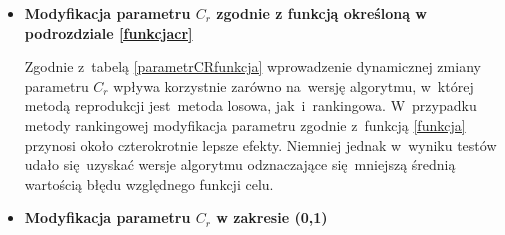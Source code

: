 \begin{itemize}
\item  \textbf{Modyfikacja parametru $C_{r}$ zgodnie z funkcją określoną w podrozdziale \ref{funkcjacr}}


\begin{table}[h!]
\begin{center}
\caption{Wartości średniego błędu względnego funkcji celu dla metody krzyżowania dwumianowego ze zmiennym parametrem $C_{r}$ zgodnie z funkcją \ref{funkcjacr}.}
\label{parametrCRfunkcja}
\end{center}
\end{table}

Zgodnie z~tabelą \ref{parametrCRfunkcja} wprowadzenie dynamicznej zmiany parametru $C_{r}$ wpływa korzystnie zarówno na~wersję algorytmu, w~której metodą reprodukcji jest~metoda losowa, jak~i~rankingowa. W~przypadku metody rankingowej modyfikacja parametru zgodnie z~funkcją \ref{funkcja} przynosi około czterokrotnie lepsze efekty. Niemniej jednak w~wyniku testów udało się~uzyskać wersje algorytmu odznaczające się~mniejszą średnią wartością błędu względnego funkcji celu. 
\item \textbf{Modyfikacja parametru $C_{r}$ w zakresie (0,1)}


\end{itemize}
